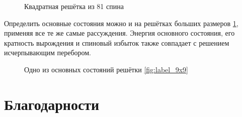 \documentclass[utf8, babel, sor, jor, amsmath,amssymb, reprint]{elsarticle} %
\begin{document}
\begin{figure}[h]
	\centering
	\caption{Квадратная решётка из 81 спина}
	\label{fig:label_9x9}
\end{figure}



Определить основные состояния можно и на решётках больших размеров \ref{fig:label_9x9}, применяя все те же самые рассуждения. Энергия основного состояния, его кратность вырождения и спиновый избыток также совпадает с решением исчерпывающим перебором.

\begin{figure}[h]
	\centering
	\caption{Одно из основных состояний решётки \eqref{fig:label_9x9}}
	\label{fig:label_9x9_gs_1}
\end{figure}




\section{Благодарности}

 


\end{document}

